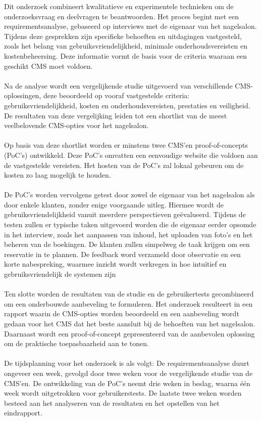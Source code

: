 \noindent
Dit onderzoek combineert kwalitatieve en experimentele technieken om de onderzoeksvraag en deelvragen te beantwoorden. Het proces begint met een requirementsanalyse, gebaseerd op interviews met de eigenaar van het nagelsalon. Tijdens deze gesprekken zijn specifieke behoeften en uitdagingen vastgesteld, zoals het belang van gebruiksvriendelijkheid, minimale onderhoudsvereisten en kostenbeheersing. Deze informatie vormt de basis voor de criteria waaraan een geschikt CMS moet voldoen.
\\ \\
Na de analyse wordt een vergelijkende studie uitgevoerd van verschillende CMS-oplossingen, deze beoordeeld op vooraf vastgestelde criteria: gebruiksvriendelijkheid, kosten en onderhoudsvereisten, prestaties en veiligheid. De resultaten van deze vergelijking leiden tot een shortlist van de meest veelbelovende CMS-opties voor het nagelsalon.
\\ \\
Op basis van deze shortlist worden er minstens twee CMS’en proof-of-concepts (PoC’s) ontwikkeld. Deze PoC's omvatten een eenvoudige website die voldoen aan de vastgestelde vereisten. Het hosten van de PoC's zal lokaal gebeuren om de kosten zo laag mogelijk te houden.
\\ \\
De PoC’s worden vervolgens getest door zowel de eigenaar van het nagelsalon als door enkele klanten, zonder enige voorgaande uitleg. Hiermee wordt de gebruiksvriendelijkheid vanuit meerdere perspectieven geëvalueerd. Tijdens de testen zullen er typische taken uitgevoerd worden die de eigenaar eerder opsomde in het interview, zoals het aanpassen van inhoud, het uploaden van foto’s en het beheren van de boekingen. De klanten zullen simpelweg de taak krijgen om een reservatie in te plannen. De feedback word verzameld door observatie en een korte nabespreking, waarmee inzicht wordt verkregen in hoe intuïtief en gebruiksvriendelijk de systemen zijn
\\ \\
Ten slotte worden de resultaten van de studie en de gebruikertests gecombineerd om een onderbouwde aanbeveling te formuleren. Het onderzoek resulteert in een rapport waarin de CMS-opties worden beoordeeld en een aanbeveling wordt gedaan voor het CMS dat het beste aansluit bij de behoeften van het nagelsalon. Daarnaast wordt een proof-of-concept gepresenteerd van de aanbevolen oplossing om de praktische toepasbaarheid aan te tonen.
\\ \\
De tijdsplanning voor het onderzoek is als volgt:
De requirementsanalyse duurt ongeveer een week, gevolgd door twee weken voor de vergelijkende studie van de CMS’en. De ontwikkeling van de PoC’s neemt drie weken in beslag, waarna één week wordt uitgetrokken voor gebruikerstests. De laatste twee weken worden besteed aan het analyseren van de resultaten en het opstellen van het eindrapport.

